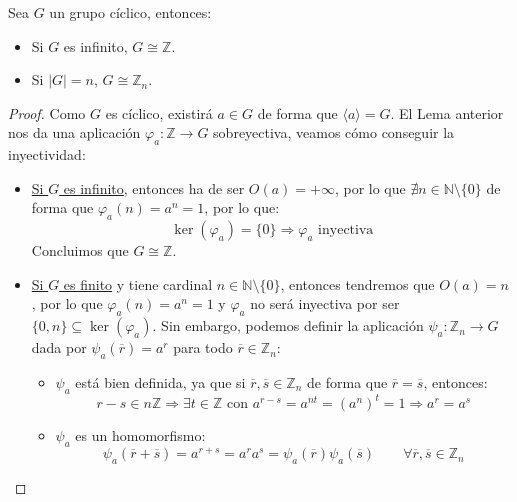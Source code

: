 \begin{teo}
    Sea $G$ un grupo cíclico, entonces:
    \begin{itemize}
        \item Si $G$ es infinito, $G\cong \mathbb{Z}$.
        \item Si $|G| = n$, $G\cong \mathbb{Z}_n$.
    \end{itemize}
    \begin{proof}
        Como $G$ es cíclico, existirá $a\in G$ de forma que $\langle a \rangle = G$. El Lema anterior nos da una aplicación $\varphi_a:\mathbb{Z}\to G$ sobreyectiva, veamos cómo conseguir la inyectividad:
        \begin{itemize}
            \item \underline{Si $G$ es infinito}, entonces ha de ser $O(a)=+\infty$, por lo que $\nexists n\in \mathbb{N}\setminus\{0\}$ de forma que $\varphi_a(n) = a^n = 1$, por lo que:
                \begin{equation*}
                    \ker(\varphi_a) = \{0\} \Longrightarrow \varphi_a \text{\ inyectiva}
                \end{equation*}
                Concluimos que $G\cong \mathbb{Z}$.
            \item \underline{Si $G$ es finito} y tiene cardinal $n\in \mathbb{N}\setminus\{0\}$, entonces tendremos que $O(a) = n$, por lo que $\varphi_a(n) = a^n = 1$ y $\varphi_a$ no será inyectiva por ser $\{0,n\}\subseteq \ker(\varphi_a)$. Sin embargo, podemos definir la aplicación $\psi_a:\mathbb{Z}_n\to G$ dada por $\psi_a(\overline{r}) = a^r$ para todo $\overline{r}\in \mathbb{Z}_n$:
                \begin{itemize}
                    \item $\psi_a$ está bien definida, ya que si $\overline{r},\overline{s}\in \mathbb{Z}_n$ de forma que $\overline{r}=\overline{s}$, entonces:
                        \begin{equation*}
                            r-s\in n\mathbb{Z} \Longrightarrow \exists t\in \mathbb{Z} \text{\ con\ }  a^{r-s} = a^{nt} = {(a^n)}^{t} = 1 \Longrightarrow a^r = a^s
                        \end{equation*}
                    \item $\psi_a$ es un homomorfismo:
                        \begin{equation*}
                            \psi_a(\overline{r}+\overline{s}) = a^{r+s} = a^r a^s = \psi_a(\overline{r})\psi_a(\overline{s}) \qquad \forall \overline{r},\overline{s}\in \mathbb{Z}_n

\end{equation*}
\end{itemize}
\end{itemize}
\end{proof}
\end{teo}
